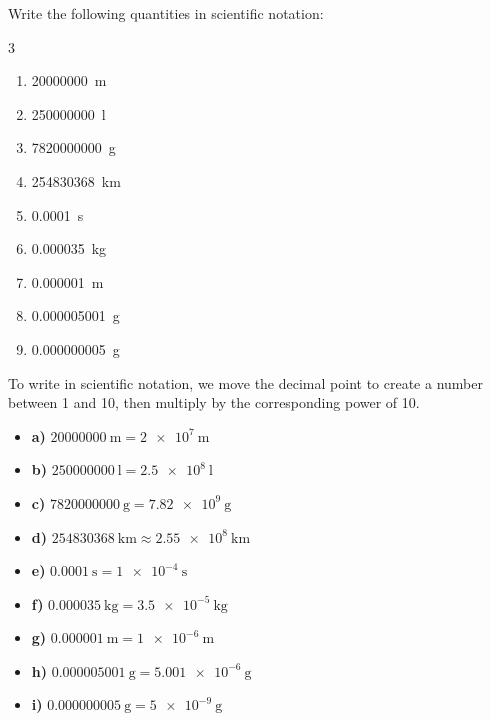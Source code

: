 \begin{exercise}
    Write the following quantities in scientific notation:
    \begin{multicols}{3}
        \begin{enumerate}[label=\letraminuscula]
\item \qty{20000000}{\m}
\item \qty{250000000}{\litre}
\item \qty{7820000000}{\g}
\item \qty{254830368}{\km}
\item \qty{0.0001}{\s}
\item \qty{0.000035}{\kilo\g}
\item \qty{0.000001}{\m}
\item \qty{0.000005001}{\g}
\item \qty{0.000000005}{\g}
        \end{enumerate}
    \end{multicols}

    \begin{solu}
        To write in scientific notation, we move the decimal point to create a number between 1 and 10, then multiply by the corresponding power of 10.
        \begin{itemize}
            \item \textbf{a)} \( \qty{20000000}{\m} = \qty{2e7}{\m} \)
            \item \textbf{b)} \( \qty{250000000}{\litre} = \qty{2.5e8}{\litre} \)
            \item \textbf{c)} \( \qty{7820000000}{\g} = \qty{7.82e9}{\g} \)
            \item \textbf{d)} \( \qty{254830368}{\km} \approx \qty{2.55e8}{\km} \)
            \item \textbf{e)} \( \qty{0.0001}{\s} = \qty{1e-4}{\s} \)
            \item \textbf{f)} \( \qty{0.000035}{\kg} = \qty{3.5e-5}{\kg} \)
            \item \textbf{g)} \( \qty{0.000001}{\m} = \qty{1e-6}{\m} \)
            \item \textbf{h)} \( \qty{0.000005001}{\g} = \qty{5.001e-6}{\g} \)
            \item \textbf{i)} \( \qty{0.000000005}{\g} = \qty{5e-9}{\g} \)
        \end{itemize}
    \end{solu}

\end{exercise}
